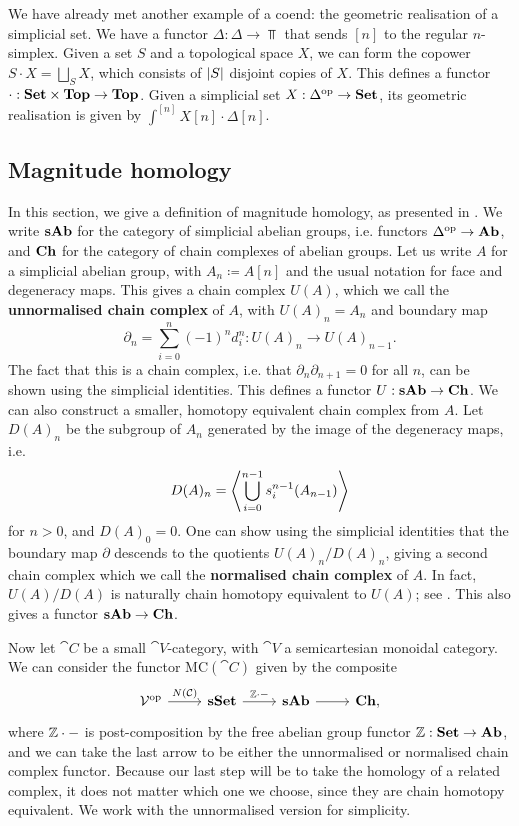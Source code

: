\begin{example}\label{coend-geometric-realisation}
    We have already met another example of a coend: the geometric realisation of a simplicial set. We have a functor $\Delta : \Delta \to \Top$ that sends $[n]$ to the regular $n$-simplex. Given a set $S$ and a topological space $X$, we can form the copower $S \cdot X = \bigsqcup_S X$, which consists of $\abs{S}$ disjoint copies of $X$. This defines a functor $\cdot : \Set \times \Top \to \Top$. Given a simplicial set $X : \Delta^\opp \to \Set$, its geometric realisation is given by $\int^{[n]} X[n] \cdot \Delta[n]$.
\end{example}

\subsection{Magnitude homology}
In this section, we give a definition of magnitude homology, as presented in \cite{Leinster2016mag}. We write $\sAb$ for the category of simplicial abelian groups, i.e. functors $\Delta^\opp \to \Ab$, and $\Ch$ for the category of chain complexes of abelian groups. Let us write $A$ for a simplicial abelian group, with $A_n \coloneqq A[n]$ and the usual notation for face and degeneracy maps. This gives a chain complex $U(A)$, which we call the \textbf{unnormalised chain complex} of $A$, with $U(A)_n = A_n$ and boundary map
\[\partial_n = \sum_{i=0}^n (-1)^n d_i^n : U(A)_n \to U(A)_{n-1}.\]
The fact that this is a chain complex, i.e. that $\partial_n \partial_{n+1} = 0$ for all $n$, can be shown using the simplicial identities. This defines a functor $U : \sAb \to \Ch$. We can also construct a smaller, homotopy equivalent chain complex from $A$. Let $D(A)_n$ be the subgroup of $A_n$ generated by the image of the degeneracy maps, i.e. 
\[D(A)_n = \ang*{ \bigcup_{i=0}^{n-1} s^{n-1}_i(A_{n-1})}\]
for $n > 0$, and $D(A)_0 = 0$. One can show using the simplicial identities that the boundary map $\partial$ descends to the quotients $U(A)_n/D(A)_n$, giving a second chain complex which we call the \textbf{normalised chain complex} of $A$. In fact, $U(A)/D(A)$ is naturally chain homotopy equivalent to $U(A)$; see \cite[\S III.2]{Goerss2009}. This also gives a functor $\sAb \to \Ch$.

Now let $\cat{C}$ be a small $\cat{V}$-category, with $\cat{V}$ a semicartesian monoidal category. We can consider the functor $\textrm{MC}(\cat{C})$ given by the composite
\[\begin{tikzcd}
    \cat{V}^\opp \ar[r, "N(\cat{C})"] & \sSet \ar[r, "\Z \cdot -"] & \sAb \ar[r] & \Ch,
\end{tikzcd}\]
where $\Z \cdot -$ is post-composition by the free abelian group functor $\Z : \Set \to \Ab$, and we can take the last arrow to be either the unnormalised or normalised chain complex functor. Because our last step will be to take the homology of a related complex, it does not matter which one we choose, since they are chain homotopy equivalent. We work with the unnormalised version for simplicity.

